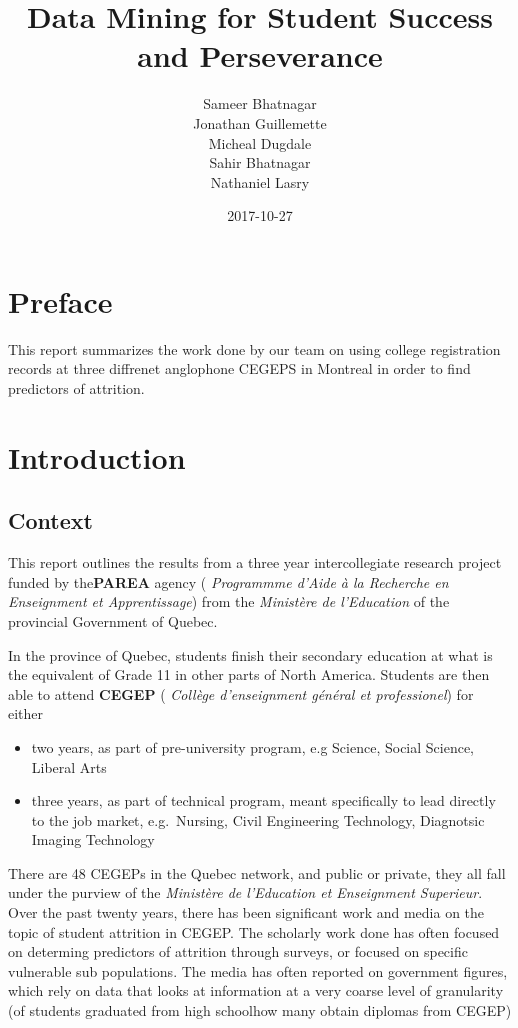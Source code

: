 \documentclass[]{book}
\title{Data Mining for Student Success and Perseverance}
\author{Sameer Bhatnagar \\ Jonathan Guillemette \\ Micheal Dugdale \\ Sahir Bhatnagar \\ Nathaniel Lasry}
\date{2017-10-27}
\providecommand{\tightlist}{%
  \setlength{\itemsep}{0pt}\setlength{\parskip}{0pt}}
\theoremstyle{definition}
\theoremstyle{definition}
\theoremstyle{remark}
\begin{document}
\maketitle

{
\setcounter{tocdepth}{1}
\tableofcontents
}
\chapter{Preface}\label{preface}

This report summarizes the work done by our team on using college
registration records at three diffrenet anglophone CEGEPS in Montreal in
order to find predictors of attrition.

\chapter{Introduction}\label{intro}

\section{Context}\label{context}

This report outlines the results from a three year intercollegiate
research project funded by the\textbf{PAREA} agency ( \emph{Programmme
d'Aide à la Recherche en Enseignment et Apprentissage}) from the
\emph{Ministère de l'Education} of the provincial Government of Quebec.

In the province of Quebec, students finish their secondary education at
what is the equivalent of Grade 11 in other parts of North America.
Students are then able to attend \textbf{CEGEP} ( \emph{Collège
d'enseignment général et professionel}) for either

\begin{itemize}
\tightlist
\item
  two years, as part of pre-university program, e.g Science, Social
  Science, Liberal Arts
\item
  three years, as part of technical program, meant specifically to lead
  directly to the job market, e.g.~Nursing, Civil Engineering
  Technology, Diagnotsic Imaging Technology
\end{itemize}

There are 48 CEGEPs in the Quebec network, and public or private, they
all fall under the purview of the \emph{Ministère de l'Education et
Enseignment Superieur}. Over the past twenty years, there has been
significant
work\citep{jorgensen2003students, jorgensen2005academic, jorgensen2009predicting, riviere1995decrocheurs, shaienks2008statcan}
and media
\citep{breton2016soleil, dion-viens2015lapresse, duchaine2017lapresse}
on the topic of student attrition in CEGEP. The scholarly work done has
often focused on determing predictors of attrition through surveys, or
focused on specific vulnerable sub populations. The media has often
reported on government figures, which rely on data that looks at
information at a very coarse level of granularity (of students graduated
from high schoolhow many obtain diplomas from CEGEP)
\end{document}
